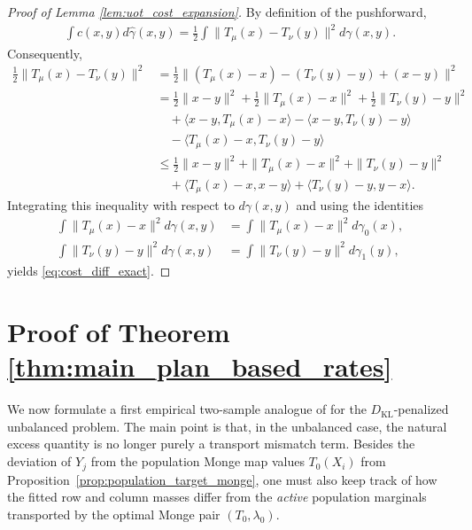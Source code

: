 \documentclass[11pt,reqno]{amsart}
\theoremstyle{definition}
\newcommand{\KL}{\mathrm{KL}}
\renewcommand{\hat}{\widehat}
\begin{document}
\begin{proof}[Proof of Lemma \ref{lem:uot_cost_expansion}]
By definition of the pushforward,
\begin{align*}
    \int c(x,y) d\hat\gamma(x,y)
    =
    \frac{1}{2}\int \|T_\mu(x) - T_\nu(y)\|^2 d\gamma(x,y).
\end{align*}
Consequently,
\begin{align*}
\tfrac{1}{2}\|T_\mu(x) - T_\nu(y)\|^2
&=
\tfrac{1}{2}\|(T_\mu(x)-x) - (T_\nu(y)-y) + (x-y)\|^2 \\
&=
\tfrac{1}{2}\|x-y\|^2 + \tfrac{1}{2}\|T_\mu(x)-x\|^2 + \tfrac{1}{2}\|T_\nu(y)-y\|^2 \\
&\quad + \langle x-y, T_\mu(x)-x \rangle - \langle x-y, T_\nu(y)-y \rangle \\
&\quad - \langle T_\mu(x)-x, T_\nu(y)-y \rangle \\
&\le
\tfrac{1}{2}\|x-y\|^2 + \|T_\mu(x)-x\|^2 + \|T_\nu(y)-y\|^2 \\
&\quad + \langle T_\mu(x)-x, x-y \rangle + \langle T_\nu(y)-y, y-x \rangle.
\end{align*}
Integrating this inequality with respect to $d\gamma(x,y)$ and using the identities
\begin{align*}
    \int \|T_\mu(x)-x\|^2 d\gamma(x,y)
    &=
    \int \|T_\mu(x)-x\|^2 d\gamma_0(x),\\
    \int \|T_\nu(y)-y\|^2 d\gamma(x,y)
    &=
    \int \|T_\nu(y)-y\|^2 d\gamma_1(y),
\end{align*}
yields \eqref{eq:cost_diff_exact}.
\end{proof}


\section{Proof of Theorem \ref{thm:main_plan_based_rates}} \label{sec:proof_plan_based_rates}

We now formulate a first empirical two-sample analogue of \cite[Proposition~13]{manole2024plugin} for the {$D_\KL$-penalized} unbalanced problem.
The main point is that, in the unbalanced case, the natural excess quantity is no longer purely a transport mismatch term.
Besides the deviation of $Y_j$ from the population Monge map values $T_0(X_i)$ from Proposition~\ref{prop:population_target_monge}, one must also keep track of how the fitted row and column masses differ from the \emph{active} population marginals transported by the optimal Monge pair $(T_0,\lambda_0)$.
\end{document}

